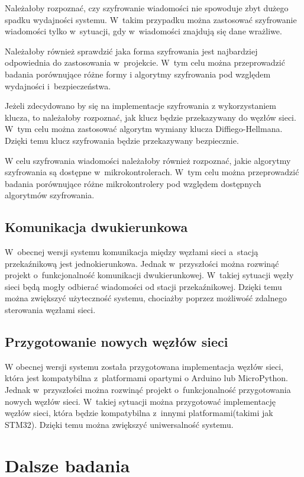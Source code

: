 Należałoby rozpoznać, czy szyfrowanie wiadomości nie spowoduje zbyt dużego spadku wydajności systemu. W~takim przypadku można zastosować szyfrowanie wiadomości tylko w~sytuacji, gdy w~wiadomości znajdują się dane wrażliwe.

Należałoby również sprawdzić jaka forma szyfrowania jest najbardziej odpowiednia do zastosowania w~projekcie. W~tym celu można przeprowadzić badania porównujące różne formy i algorytmy szyfrowania pod względem wydajności i~bezpieczeństwa.

Jeżeli zdecydowano by się na implementacje szyfrowania z wykorzystaniem klucza, to należałoby rozpoznać, jak klucz będzie przekazywany do węzłów sieci. W~tym celu można zastosować algorytm wymiany klucza Diffiego-Hellmana. Dzięki temu klucz szyfrowania będzie przekazywany bezpiecznie.

W celu szyfrowania wiadomości należałoby również rozpoznać, jakie algorytmy szyfrowania są dostępne w~mikrokontrolerach. W~tym celu można przeprowadzić badania porównujące różne mikrokontrolery pod względem dostępnych algorytmów szyfrowania.

\subsection{Komunikacja dwukierunkowa}
W~obecnej wersji systemu komunikacja między węzłami sieci a~stacją przekaźnikową jest jednokierunkowa. Jednak w~przyszłości można rozwinąć projekt o~funkcjonalność komunikacji dwukierunkowej. W~takiej sytuacji węzły sieci będą mogły odbierać wiadomości od stacji przekaźnikowej. Dzięki temu można zwiększyć użyteczność systemu, chociażby poprzez możliwość zdalnego sterowania węzłami sieci.

\subsection{Przygotowanie nowych węzłów sieci}
W obecnej wersji systemu została przygotowana implementacja węzłów sieci, która jest kompatybilna z~platformami opartymi o Arduino lub MicroPython. Jednak w~przyszłości można rozwinąć projekt o~funkcjonalność przygotowania nowych węzłów sieci. W~takiej sytuacji można przygotować implementację węzłów sieci, która będzie kompatybilna z~innymi platformami(takimi jak STM32). Dzięki temu można zwiększyć uniwersalność systemu.

\section{Dalsze badania}

